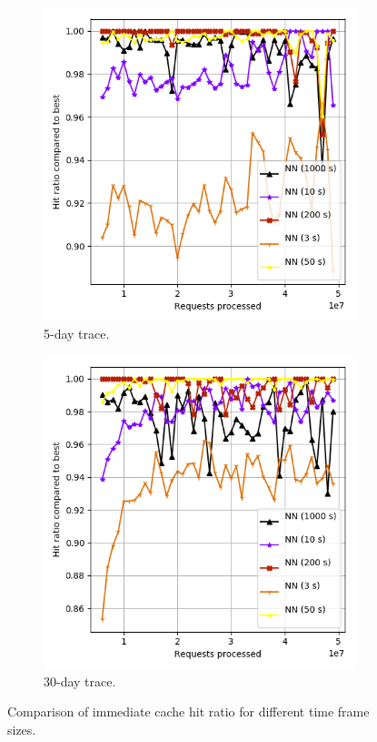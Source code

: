 \begin{figure}[b!]
	\centering
	
	\begin{subfigure}[b]{0.49\linewidth}
		\includegraphics[width=\linewidth]{pics/cache7.png}
		\caption{5-day trace.}
	\end{subfigure}
	\begin{subfigure}[b]{0.49\linewidth}
		\includegraphics[width=\linewidth]{pics/cache7_2.png}
		\caption{30-day trace.}
	\end{subfigure}
	\caption{Comparison of immediate cache hit ratio for different time frame sizes.}
	\label{fig:cache7}
\end{figure}

